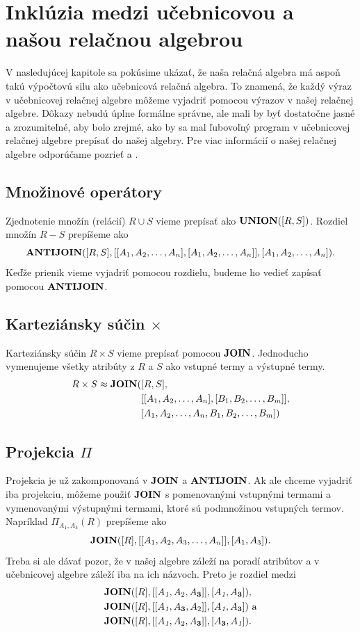 \section{Inklúzia medzi učebnicovou a našou relačnou algebrou}

V nasledujúcej kapitole sa pokúsime ukázať, že naša relačná algebra má aspoň takú výpočtovú silu ako
učebnicová relačná algebra. To znamená, že každý výraz v učebnicovej relačnej algebre môžeme
vyjadriť pomocou výrazov v našej relačnej algebre. Dôkazy nebudú úplne formálne správne, ale mali by
byť dostatočne jasné a zrozumiteľné, aby bolo zrejmé, ako by sa mal ľubovoľný program v učebnicovej
relačnej algebre prepísať do našej algebry. Pre viac informácií o našej relačnej algebre odporúčame
pozrieť \cite{RAcompilator} a \cite{JAVAimple}.

\subsection*{Množinové operátory}
Zjednotenie množín (relácií) $R \cup S$ vieme prepísať ako $\textbf{UNION}([R, S])$. Rozdiel množín $R - S$
prepíšeme ako $$\textbf{ANTIJOIN}([R, S], [[A_1, A_2, \dots, A_n], [A_1, A_2, \dots, A_n]], [A_1, A_2,
\dots, A_n])\text{.}$$ Keďže prienik vieme vyjadriť pomocou rozdielu, budeme ho vedieť zapísať
pomocou $\textbf{ANTIJOIN}$.

\subsection*{Karteziánsky súčin $\times$}
Karteziánsky súčin $R \times S$ vieme prepísať pomocou $\textbf{JOIN}$. Jednoducho vymenujeme všetky
atribúty z $R$ a $S$ ako vstupné termy a výstupné termy. 
\begin{align*}
    R \times S \approx \textbf{JOIN}(&[R, S],\\ 
                             &[[A_1, A_2, \dots, A_n], [B_1, B_2, \dots, B_m]],\\ 
                             &[A_1, A_2, \dots, A_n, B_1, B_2, \dots, B_m])
\end{align*}

\subsection*{Projekcia $\Pi$}
Projekcia je už zakomponovaná v $\textbf{JOIN}$ a $\textbf{ANTIJOIN}$. Ak ale chceme vyjadriť iba projekciu, môžeme
použiť $\textbf{JOIN}$ s pomenovanými vstupnými termami a vymenovanými výstupnými termami, ktoré sú
podmnožinou vstupných termov. Napríklad $\Pi_{A_1, A_3}(R)$ prepíšeme ako $$\textbf{JOIN}([R], [[A_1, A_2,
A_3, \dots, A_n]], [A_1, A_3])\text{.}$$ Treba si ale dávať pozor, že v našej algebre záleží na
poradí atribútov a v učebnicovej algebre záleží iba na ich názvoch. Preto je rozdiel medzi
\begin{align*}
    &\textbf{JOIN}([R], [[A_\textit{1}, A_2, A_\textbf{3}]], [A_\textit{1}, A_\textbf{3}])\text{,}\\
    &\textbf{JOIN}([R], [[A_\textit{1}, A_\textbf{3}, A_2]], [A_\textit{1}, A_\textbf{3}])\text{ a}\\
    &\textbf{JOIN}([R], [[A_\textit{1}, A_2, A_\textbf{3}]], [A_\textbf{3}, A_\textit{1}])\text{.}
\end{align*}

